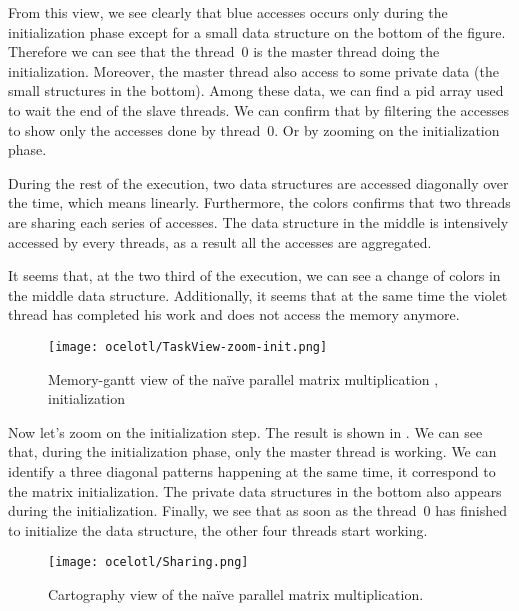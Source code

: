 From this view, we see clearly that blue accesses occurs only during the initialization phase except for a small data structure on the bottom of the figure.
Therefore we can see that the thread~$0$ is the master thread doing the initialization.
Moreover, the master thread also access to some private data (the small structures in the bottom).
Among these data, we can find a pid array used to wait the end of the slave threads.
We can confirm that by filtering the accesses to show only the accesses done by thread~$0$.
Or by zooming on the initialization phase.

During the rest of the execution, two data structures are accessed diagonally over the time, which means linearly.
Furthermore, the colors confirms that two threads are sharing each series of accesses.
The data structure in the middle is intensively accessed by every threads, as a result all the accesses are aggregated.

It seems that, at the two third of the execution, we can see a change of colors in the middle data structure.
Additionally, it seems that at the same time the violet thread has completed his work and does not access the memory anymore.

\begin{figure}[htb]
    \centering
    \texttt{[image: ocelotl/TaskView-zoom-init.png]}
    \caption{Memory-gantt view of the naïve parallel matrix multiplication ,
    initialization}
    \label{fig:ocelotl-th1}
\end{figure}

Now let's zoom on the initialization step.
The result is shown in .
We can see that, during the initialization phase, only the master thread is working.
We can identify a three diagonal patterns happening at the same time, it correspond to the matrix initialization.
The private data structures in the bottom also appears during the initialization.
Finally, we see that as soon as the thread~$0$ has finished to initialize the data structure, the other four threads start working.

\begin{figure}[htb]
    \centering
    \texttt{[image: ocelotl/Sharing.png]}
    \caption{Cartography view of the naïve parallel matrix multiplication.}
    \label{fig:ocelotl-carto0}
\end{figure}

